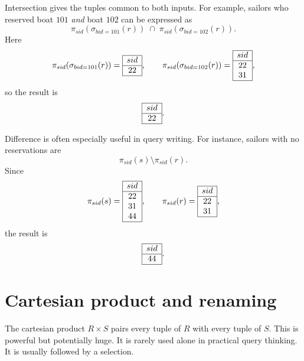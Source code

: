 \documentclass[11pt,a4paper,openany]{book}
\newcommand{\RAselect}{\sigma}
\newcommand{\RAproject}{\pi}
\begin{document}
Intersection gives the tuples common to both inputs. For example, sailors who reserved boat \(101\) \emph{and} boat \(102\) can be expressed as
\[
\RAproject_{sid}(\RAselect_{bid=101}(r))
\;\cap\;
\RAproject_{sid}(\RAselect_{bid=102}(r)).
\]
Here
\[
\RAproject_{sid}(\RAselect_{bid=101}(r))=
\begin{array}{|c|}\hline sid\\\hline 22\\\hline\end{array},
\qquad
\RAproject_{sid}(\RAselect_{bid=102}(r))=
\begin{array}{|c|}\hline sid\\\hline 22\\31\\\hline\end{array},
\]
so the result is
\[
\begin{array}{|c|}\hline sid\\\hline 22\\\hline\end{array}.
\]

Difference is often especially useful in query writing. For instance, sailors with no reservations are
\[
\RAproject_{sid}(s)\setminus \RAproject_{sid}(r).
\]
Since
\[
\RAproject_{sid}(s)=\begin{array}{|c|}\hline sid\\\hline 22\\31\\44\\\hline\end{array},
\qquad
\RAproject_{sid}(r)=\begin{array}{|c|}\hline sid\\\hline 22\\31\\\hline\end{array},
\]
the result is
\[
\begin{array}{|c|}\hline sid\\\hline 44\\\hline\end{array}.
\]

\section{Cartesian product and renaming}
The cartesian product \(R \times S\) pairs every tuple of \(R\) with every tuple of \(S\). This is powerful but potentially huge. It is rarely used alone in practical query thinking. It is usually followed by a selection.
\end{document}
